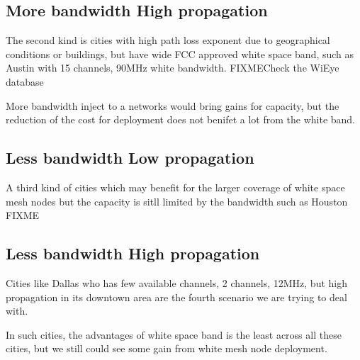 \subsection{More bandwidth High propagation}
The second kind is cities with high path loss exponent due to geographical conditions or buildings, but have wide FCC approved white space band, such as Austin with 15 channels, 90MHz white bandwidth. FIXME{Check the WiEye database}

More bandwidth inject to a networks would bring gains for capacity, but the reduction of the cost for deployment does not benifet a lot from the white band.

\subsection{Less bandwidth Low propagation}
A third kind of cities which may benefit for the larger coverage of white space mesh nodes but the capacity is sitll limited by the bandwidth such as Houston FIXME



\subsection{Less bandwidth High propagation}
Cities like Dallas who has few available channels, 2 channels, 12MHz, but high propagation in its downtown area are the fourth scenario we are trying to deal with.

In such cities, the advantages of white space band is the least across all these cities, but we still could see some gain from white mesh node deployment.




